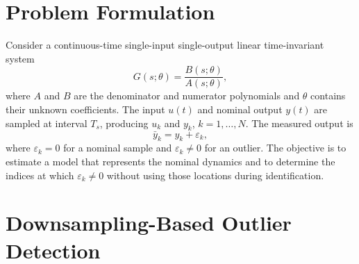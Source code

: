 \documentclass[journal]{IEEEtran}
\begin{document}
\section{Problem Formulation}
Consider a continuous-time single-input single-output linear time-invariant system
\begin{equation}
G(s;\theta)=\frac{B(s;\theta)}{A(s;\theta)},
\end{equation}
where $A$ and $B$ are the denominator and numerator polynomials and $\theta$ contains their unknown coefficients. The input $u(t)$ and nominal output $y(t)$ are sampled at interval $T_s$, producing $u_k$ and $y_k$, $k=1,\ldots,N$. The measured output is
\begin{equation}
\bar y_k=y_k+\varepsilon_k,
\end{equation}
where $\varepsilon_k=0$ for a nominal sample and $\varepsilon_k\neq0$ for an outlier. The objective is to estimate a model that represents the nominal dynamics and to determine the indices at which $\varepsilon_k\neq0$ without using those locations during identification.

\section{Downsampling-Based Outlier Detection}
\end{document}

